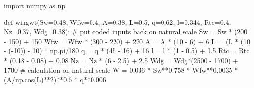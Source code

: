 \documentclass[
  letterpaper,
  DIV=11,
  numbers=noendperiod]{scrreprt}
\newenvironment{Shaded}{\begin{snugshade}}{\end{snugshade}}
\newcommand{\CommentTok}[1]{\textcolor[rgb]{0.37,0.37,0.37}{#1}}
\newcommand{\DecValTok}[1]{\textcolor[rgb]{0.68,0.00,0.00}{#1}}
\newcommand{\FloatTok}[1]{\textcolor[rgb]{0.68,0.00,0.00}{#1}}
\newcommand{\ImportTok}[1]{\textcolor[rgb]{0.00,0.46,0.62}{#1}}
\newcommand{\KeywordTok}[1]{\textcolor[rgb]{0.00,0.23,0.31}{#1}}
\newcommand{\NormalTok}[1]{\textcolor[rgb]{0.00,0.23,0.31}{#1}}
\newcommand{\OperatorTok}[1]{\textcolor[rgb]{0.37,0.37,0.37}{#1}}
\begin{document}
\begin{Shaded}
\begin{Highlighting}[]
\ImportTok{import}\NormalTok{ numpy }\ImportTok{as}\NormalTok{ np}

\KeywordTok{def}\NormalTok{ wingwt(Sw}\OperatorTok{=}\FloatTok{0.48}\NormalTok{, Wfw}\OperatorTok{=}\FloatTok{0.4}\NormalTok{, A}\OperatorTok{=}\FloatTok{0.38}\NormalTok{, L}\OperatorTok{=}\FloatTok{0.5}\NormalTok{, q}\OperatorTok{=}\FloatTok{0.62}\NormalTok{, l}\OperatorTok{=}\FloatTok{0.344}\NormalTok{,  Rtc}\OperatorTok{=}\FloatTok{0.4}\NormalTok{, Nz}\OperatorTok{=}\FloatTok{0.37}\NormalTok{, Wdg}\OperatorTok{=}\FloatTok{0.38}\NormalTok{):}
    \CommentTok{\# put coded inputs back on natural scale}
\NormalTok{    Sw }\OperatorTok{=}\NormalTok{ Sw }\OperatorTok{*}\NormalTok{ (}\DecValTok{200} \OperatorTok{{-}} \DecValTok{150}\NormalTok{) }\OperatorTok{+} \DecValTok{150} 
\NormalTok{    Wfw }\OperatorTok{=}\NormalTok{ Wfw }\OperatorTok{*}\NormalTok{ (}\DecValTok{300} \OperatorTok{{-}} \DecValTok{220}\NormalTok{) }\OperatorTok{+} \DecValTok{220} 
\NormalTok{    A }\OperatorTok{=}\NormalTok{ A }\OperatorTok{*}\NormalTok{ (}\DecValTok{10} \OperatorTok{{-}} \DecValTok{6}\NormalTok{) }\OperatorTok{+} \DecValTok{6} 
\NormalTok{    L }\OperatorTok{=}\NormalTok{ (L }\OperatorTok{*}\NormalTok{ (}\DecValTok{10} \OperatorTok{{-}}\NormalTok{ (}\OperatorTok{{-}}\DecValTok{10}\NormalTok{)) }\OperatorTok{{-}} \DecValTok{10}\NormalTok{) }\OperatorTok{*}\NormalTok{ np.pi}\OperatorTok{/}\DecValTok{180}
\NormalTok{    q }\OperatorTok{=}\NormalTok{ q }\OperatorTok{*}\NormalTok{ (}\DecValTok{45} \OperatorTok{{-}} \DecValTok{16}\NormalTok{) }\OperatorTok{+} \DecValTok{16} 
\NormalTok{    l }\OperatorTok{=}\NormalTok{ l }\OperatorTok{*}\NormalTok{ (}\DecValTok{1} \OperatorTok{{-}} \FloatTok{0.5}\NormalTok{) }\OperatorTok{+} \FloatTok{0.5}  
\NormalTok{    Rtc }\OperatorTok{=}\NormalTok{ Rtc }\OperatorTok{*}\NormalTok{ (}\FloatTok{0.18} \OperatorTok{{-}} \FloatTok{0.08}\NormalTok{) }\OperatorTok{+} \FloatTok{0.08}
\NormalTok{    Nz }\OperatorTok{=}\NormalTok{ Nz }\OperatorTok{*}\NormalTok{ (}\DecValTok{6} \OperatorTok{{-}} \FloatTok{2.5}\NormalTok{) }\OperatorTok{+} \FloatTok{2.5}
\NormalTok{    Wdg }\OperatorTok{=}\NormalTok{ Wdg}\OperatorTok{*}\NormalTok{(}\DecValTok{2500} \OperatorTok{{-}} \DecValTok{1700}\NormalTok{) }\OperatorTok{+} \DecValTok{1700}
    \CommentTok{\# calculation on natural scale}
\NormalTok{    W }\OperatorTok{=} \FloatTok{0.036} \OperatorTok{*}\NormalTok{ Sw}\OperatorTok{**}\FloatTok{0.758} \OperatorTok{*}\NormalTok{ Wfw}\OperatorTok{**}\FloatTok{0.0035} \OperatorTok{*}\NormalTok{ (A}\OperatorTok{/}\NormalTok{np.cos(L)}\OperatorTok{**}\DecValTok{2}\NormalTok{)}\OperatorTok{**}\FloatTok{0.6} \OperatorTok{*}\NormalTok{ q}\OperatorTok{**}\FloatTok{0.006} 

\end{Highlighting}
\end{Shaded}
\end{document}
